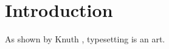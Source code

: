 \documentclass{article}
\begin{document}
\section{Introduction}
As shown by Knuth \cite{knuth}, typesetting is an art.


\end{document}
